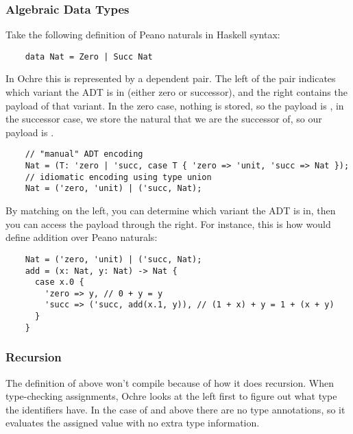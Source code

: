 \documentclass[12pt,twoside]{report}
\begin{document}
\subsubsection{Algebraic Data Types}
Take the following definition of Peano naturals in Haskell syntax:

  \begin{verbatim}
    data Nat = Zero | Succ Nat
  \end{verbatim}

In Ochre this is represented by a dependent pair. The left of the pair indicates which variant the ADT is in (either zero or successor), and the right contains the payload of that variant. In the zero case, nothing is stored, so the payload is , in the successor case, we store the natural that we are the successor of, so our payload is .

  \begin{verbatim}
    // "manual" ADT encoding
    Nat = (T: 'zero | 'succ, case T { 'zero => 'unit, 'succ => Nat });
    // idiomatic encoding using type union
    Nat = ('zero, 'unit) | ('succ, Nat);
  \end{verbatim}

By matching on the left, you can determine which variant the ADT is in, then you can access the payload through the right. For instance, this is how would define addition over Peano naturals:

  \begin{verbatim}
    Nat = ('zero, 'unit) | ('succ, Nat);
    add = (x: Nat, y: Nat) -> Nat {
      case x.0 {
        'zero => y, // 0 + y = y
        'succ => ('succ, add(x.1, y)), // (1 + x) + y = 1 + (x + y)
      }
    }
  \end{verbatim}

\subsubsection{Recursion}
The definition of  above won't compile because of how it does recursion. When type-checking assignments, Ochre looks at the left first to figure out what type the identifiers have. In the case of  and  above there are no type annotations, so it evaluates the assigned value with no extra type information.
\end{document}
